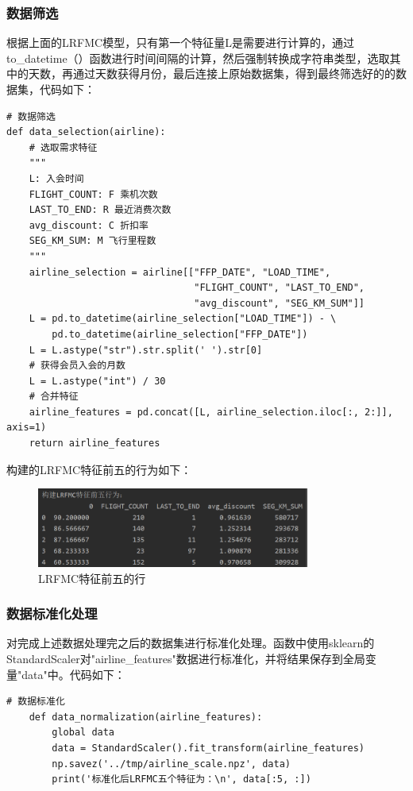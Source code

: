 \documentclass[UTF8,12pt]{article}
\begin{document}
\subsubsection{数据筛选}
根据上面的LRFMC模型，只有第一个特征量L是需要进行计算的，通过to\_datetime（）函数进行时间间隔的计算，然后强制转换成字符串类型，选取其中的天数，再通过天数获得月份，最后连接上原始数据集，得到最终筛选好的的数据集，代码如下：

\begin{lstlisting}[title=数据筛选,frame=shadowbox]
    # 数据筛选
def data_selection(airline):
    # 选取需求特征
    """
    L: 入会时间
    FLIGHT_COUNT: F 乘机次数
    LAST_TO_END: R 最近消费次数
    avg_discount: C 折扣率
    SEG_KM_SUM: M 飞行里程数
    """
    airline_selection = airline[["FFP_DATE", "LOAD_TIME",
                                 "FLIGHT_COUNT", "LAST_TO_END",
                                 "avg_discount", "SEG_KM_SUM"]]
    L = pd.to_datetime(airline_selection["LOAD_TIME"]) - \
        pd.to_datetime(airline_selection["FFP_DATE"])
    L = L.astype("str").str.split(' ').str[0]
    # 获得会员入会的月数
    L = L.astype("int") / 30
    # 合并特征
    airline_features = pd.concat([L, airline_selection.iloc[:, 2:]], axis=1)
    return airline_features

\end{lstlisting}

构建的LRFMC特征前五的行为如下：

\begin{figure}[htbp]
    \centering
    \includegraphics[width=0.8\textwidth]{img/8.png}
    \caption{LRFMC特征前五的行}
\end{figure}

\subsubsection{数据标准化处理}
对完成上述数据处理完之后的数据集进行标准化处理。函数中使用sklearn的StandardScaler对"airline\_features"数据进行标准化，并将结果保存到全局变量"data"中。代码如下：

\begin{lstlisting}[title=数据标准化处理,frame=shadowbox]
    # 数据标准化
    def data_normalization(airline_features):
        global data
        data = StandardScaler().fit_transform(airline_features)
        np.savez('../tmp/airline_scale.npz', data)
        print('标准化后LRFMC五个特征为：\n', data[:5, :])
\end{lstlisting}
\end{document}
